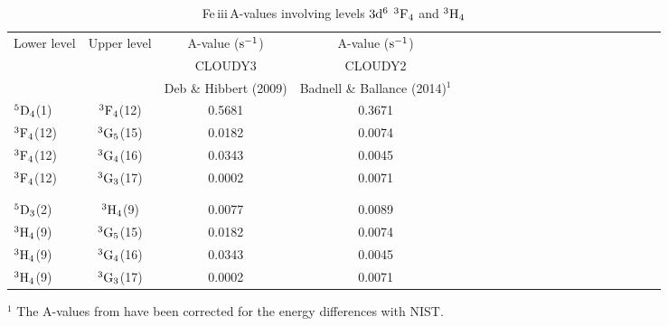\documentclass{emulateapj}
\newcommand\fe{Fe\,{\sc iii}\,}
\begin{document}
\begin{table}
{\footnotesize
\caption{ \fe A-values involving levels $\rm 3d^6$ $\rm ^3F_4$ and $\rm ^3H_4$} \label{Table:Avalues}
  \begin{tabular}{lccccccccccccccccccc} \hline\hline 

  Lower level	& Upper level 	& A-value ($\rm s^{-1}$)	&A-value ($\rm s^{-1}$) 	\\
		&			& CLOUDY3		 &CLOUDY2			\\ 

		&		&Deb \& Hibbert (2009)		&Badnell \& Ballance (2014)$^1$ 	\\ \hline
 
	$\rm ^5D_4$(1)		&$\rm ^3F_4$(12)	&0.5681				&0.3671				\\ 
	$\rm ^3F_4$(12)		&$\rm ^3G_5$(15)	&0.0182				&0.0074				\\ 
	$\rm ^3F_4$(12)		&$\rm ^3G_4$(16)	&0.0343				&0.0045				\\ 
	$\rm ^3F_4$(12)		&$\rm ^3G_3$(17)	&0.0002				&0.0071				\\ 


\\ \hline \\

	$\rm ^5D_3$(2)		&$\rm ^3H_4$(9)		&0.0077				&0.0089				\\ 
	$\rm ^3H_4$(9)		&$\rm ^3G_5$(15)	&0.0182				&0.0074				\\ 
	$\rm ^3H_4$(9)		&$\rm ^3G_4$(16)	&0.0343				&0.0045				\\ 
	$\rm ^3H_4$(9)		&$\rm ^3G_3$(17)	&0.0002				&0.0071				\\  







\hline \hline
\end{tabular} 

{$^1$ The A-values from \citet{2014ApJ...785...99B} have been corrected for the energy differences with NIST. }

}

\end{table}
\end{document}
